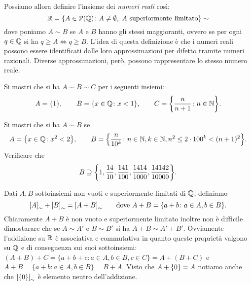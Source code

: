 Possiamo allora definire l'insieme dei \emph{numeri reali}
così:
%
%
%
\[
{\mathbb R} = {\left\{ A \in \mathcal P({\mathbb Q})\colon A\neq \emptyset, \text{ $A$ superiormente 
limitato} \right\}}\sim
\]
dove poniamo $A\sim B$ 
se $A$ e $B$ hanno gli stessi maggioranti, ovvero
se per ogni $q\in {\mathbb Q}$ si ha $q\ge A \iff q\ge B$.
L'idea di questa definizione è che i numeri reali 
possono essere identificati dalle loro approssimazioni 
per difetto tramite numeri razionali. 
Diverse approssimazioni, però, possono rappresentare 
lo stesso numero reale.

\begin{exercise}
  Si mostri che si ha $A \sim B \sim C$
  per i seguenti insiemi:
  \[
  A = {\left\{ 1 \right\}}, \qquad 
  B = {\left\{ x\in {\mathbb Q}\colon x<1 \right\}}, \qquad
  C = {\left\{ \frac{n}{n+1}\colon n\in {\mathbb N} \right\}}.
  \]
\end{exercise}

\begin{exercise}
  Si mostri che si ha $A\sim B$ se
  \[
  A = {\left\{ x\in {\mathbb Q}\colon x^2<2 \right\}}, \qquad
  B = {\left\{ \frac{n}{10^k}\colon n\in {\mathbb N}, k\in {\mathbb N}, n^2 \le 2\cdot 100^k < (n+1)^2 \right\}}.  
  \]
  Verificare che 
  \[
    B \supseteq {\left\{ 
      1,\frac{14}{10},\frac{141}{100},\frac{1414}{1000},
      \frac{14142}{10000} \right\}}.
  \]
\end{exercise}

Dati $A,B$ sottoinsiemi non vuoti e superiormente limitati di ${\mathbb Q}$, 
definiamo 
\[
  {\left[ A \right]}_\sim+{\left[ B \right]}_\sim
  = {\left[ A+B \right]}_\sim
  \qquad\text{dove $A+B = {\left\{ a+b\colon a \in A, b \in B \right\}}$.}
\]
Chiaramente $A+B$ è non vuoto e superiormente limitato
inoltre non è difficile dimostarare che 
se $A\sim A'$ e $B\sim B'$ si ha $A+B\sim A'+B'$.
Ovviamente l'addizione su ${\mathbb R}$ è associativa e commutativa in quanto 
queste proprietà valgono su ${\mathbb Q}$ e di conseguenza sui suoi sottoinsiemi:
$(A+B)+C = \{ a+b+c\colon a\in A, b\in B, c\in C\} = A + (B+C)$ e 
$A+B = \{a+b\colon a\in A, b\in B\} = B+A$.
Visto che $A+{\left\{ 0 \right\}} = A$ notiamo anche che ${\left[ {\left\{ 0 \right\}} \right]}_\sim$ 
è elemento neutro dell'addizione.

